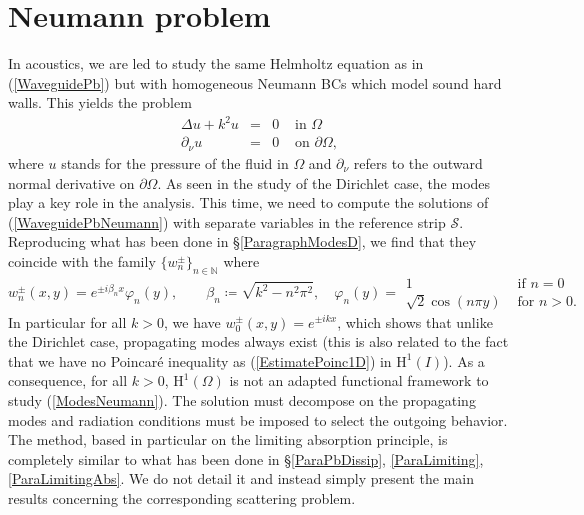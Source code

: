 \documentclass[11pt,a4paper]{report}
\newcommand{\Om}{\Omega}
\newcommand{\mrm}[1]{\mathrm{#1}}
\newcommand{\N}{\mathbb{N}}
\newcommand{\mH}{\mrm{H}}
\begin{document}
\section{Neumann problem}

In acoustics, we are led to study the same Helmholtz equation as in (\ref{WaveguidePb}) but with homogeneous Neumann BCs which model sound hard walls. This yields the problem 
\begin{equation}\label{WaveguidePbNeumann}
\begin{array}{|rcll}
\Delta u+k^2u&=&0&\mbox{ in }\Om \\[2pt]
\partial_{\nu}u&=&0&\mbox{ on }\partial\Om,
\end{array}
\end{equation}
where $u$ stands for the pressure of the fluid in $\Om$ and $\partial_{\nu}$ refers to the outward normal derivative on $\partial\Om$. As seen in the study of the Dirichlet case, the modes play a key role in the analysis. This time, we need to compute the solutions of (\ref{WaveguidePbNeumann}) with separate variables in the reference strip $\mathcal{S}$. Reproducing what has been done in \S\ref{ParagraphModesD}, we find that they coincide with the family $\{w^\pm_n\}_{n\in\N}$ where 
\begin{equation}\label{ModesNeumann}
w^\pm_n(x,y)=e^{\pm i\beta_n x}\varphi_n(y),\qquad\beta_n\coloneqq\sqrt{k^2-n^2\pi^2},\quad\varphi_n(y)=\begin{array}{|ll}
1 & \mbox{ if }n=0\\
\sqrt{2}\cos(n\pi y) & \mbox{ for }n>0.
\end{array}
\end{equation}
In particular for all $k>0$, we have $w^\pm_0(x,y)=e^{\pm ikx}$, which shows that unlike the Dirichlet case, propagating modes always exist (this is also related to the fact that we have no Poincar\'e inequality as (\ref{EstimatePoinc1D}) in $\mH^1(I)$). As a consequence, for all $k>0$, $\mH^1(\Om)$ is not an adapted functional framework to study (\ref{ModesNeumann}). The solution must decompose on the propagating modes and radiation conditions must be imposed to select the outgoing behavior. The method, based in particular on the limiting absorption principle, is completely similar to what has been done in \S\ref{ParaPbDissip}, \ref{ParaLimiting}, \ref{ParaLimitingAbs}. We do not detail it and instead simply present the main results concerning the corresponding scattering problem. \\
\newline 
\end{document}
